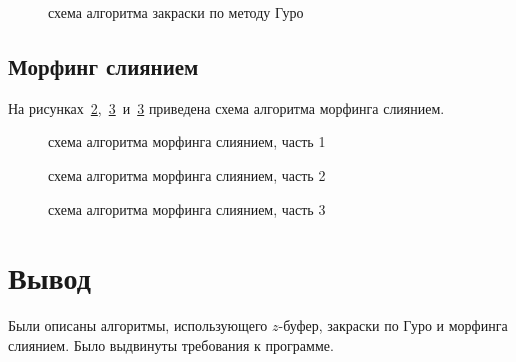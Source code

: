 \begin{figure}[h]
	\centering
	
	\caption{схема алгоритма закраски по методу Гуро}
	\label{fig:guro}
\end{figure}

\clearpage

\subsection{Морфинг слиянием}

На рисунках~\ref{fig:morph1},~\ref{fig:morph2}~и~\ref{fig:morph2} приведена схема алгоритма морфинга слиянием.

\begin{figure}[h]
	\centering
	
	\caption{схема алгоритма морфинга слиянием, часть 1}
	\label{fig:morph1}
\end{figure}

\begin{figure}[h]
	\centering
	
	\caption{схема алгоритма морфинга слиянием, часть 2}
	\label{fig:morph2}
\end{figure}

\begin{figure}[h]
	\centering
	
	\caption{схема алгоритма морфинга слиянием, часть 3}
	\label{fig:morph3}
\end{figure}

\clearpage

\section*{Вывод}
Были описаны алгоритмы, использующего $z$-буфер, закраски по Гуро и морфинга слиянием. Было выдвинуты требования к программе.